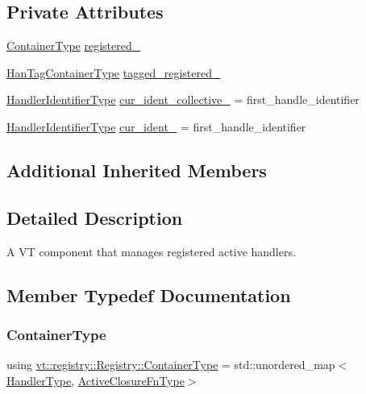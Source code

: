 \subsection*{Private Attributes}
\begin{DoxyCompactItemize}
\item 
\hyperlink{structvt_1_1registry_1_1_registry_ac9e1297d26b6c553ccdaa46858cdb3b8}{Container\+Type} \hyperlink{structvt_1_1registry_1_1_registry_adb3e36c663839801759d6bd264b8c4b5}{registered\+\_\+}
\item 
\hyperlink{structvt_1_1registry_1_1_registry_ab5d336044aee749d39c8feabe4fa6983}{Han\+Tag\+Container\+Type} \hyperlink{structvt_1_1registry_1_1_registry_ad7d3a1810876242414c29c24db82bb6c}{tagged\+\_\+registered\+\_\+}
\item 
\hyperlink{namespacevt_a59ae068fe828d1c33051ff96f3d016b6}{Handler\+Identifier\+Type} \hyperlink{structvt_1_1registry_1_1_registry_afbdfcfbd2a8c30820545587e1650fb20}{cur\+\_\+ident\+\_\+collective\+\_\+} = first\+\_\+handle\+\_\+identifier
\item 
\hyperlink{namespacevt_a59ae068fe828d1c33051ff96f3d016b6}{Handler\+Identifier\+Type} \hyperlink{structvt_1_1registry_1_1_registry_a8aed0f506143750c8444f7b6660be1c5}{cur\+\_\+ident\+\_\+} = first\+\_\+handle\+\_\+identifier
\end{DoxyCompactItemize}
\subsection*{Additional Inherited Members}


\subsection{Detailed Description}
A VT component that manages registered active handlers. 

\subsection{Member Typedef Documentation}
\mbox{\label{structvt_1_1registry_1_1_registry_ac9e1297d26b6c553ccdaa46858cdb3b8}} 
\subsubsection{\texorpdfstring{Container\+Type}{ContainerType}}
{\footnotesize\ttfamily using \hyperlink{structvt_1_1registry_1_1_registry_ac9e1297d26b6c553ccdaa46858cdb3b8}{vt\+::registry\+::\+Registry\+::\+Container\+Type} =  std\+::unordered\+\_\+map$<$\hyperlink{namespacevt_af64846b57dfcaf104da3ef6967917573}{Handler\+Type}, \hyperlink{namespacevt_a2a06c34cafcd511828f16cbf1476b924}{Active\+Closure\+Fn\+Type}$>$}

